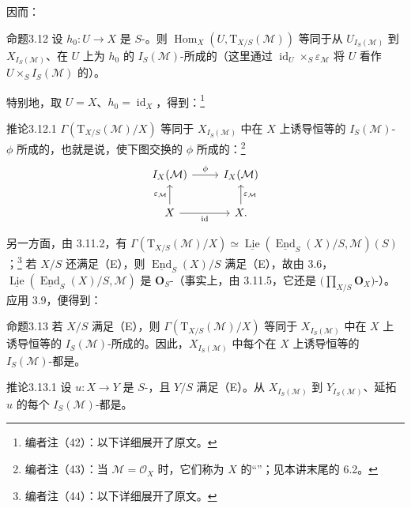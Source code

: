 因而：
\begin{SGAresult}{命题}{3.12}
设 $h_0:U\to X$ 是 $S$-。则 $\operatorname{Hom}_X(U,\mathrm T_{X/S}(\mathcal M))$ 等同于从 $U_{I_S(\mathcal M)}$ 到 $X_{I_S(\mathcal M)}$、在 $U$ 上为 $h_0$ 的 $I_S(\mathcal M)$-所成的（这里通过 $\operatorname{id}_U\times_S\varepsilon_{\mathcal M}$ 将 $U$ 看作 $U\times_S I_S(\mathcal M)$ 的）。
\end{SGAresult}
特别地，取 $U=X$、$h_0=\operatorname{id}_X$，得到：\footnote{编者注（42）：以下详细展开了原文。}
\begin{SGAresult}{推论}{3.12.1}
 $\Gamma(\mathrm T_{X/S}(\mathcal M)/X)$ 等同于 $X_{I_S(\mathcal M)}$ 中在 $X$ 上诱导恒等的 $I_S(\mathcal M)$- $\phi$ 所成的，也就是说，使下图交换的 $\phi$ 所成的：\footnote{编者注（43）：当 $\mathcal M=\mathcal O_X$ 时，它们称为 $X$ 的“”；见本讲末尾的 6.2。}
\[
\begin{tikzcd}
I_X(\mathcal M)\arrow[r,"\phi"]&I_X(\mathcal M)\\
X\arrow[u,"\varepsilon_{\mathcal M}"]\arrow[r,"\operatorname{id}"']&X\arrow[u,"\varepsilon_{\mathcal M}"'].
\end{tikzcd}
\]
\end{SGAresult}
另一方面，由 3.11.2，有 $\Gamma(\mathrm T_{X/S}(\mathcal M)/X)\simeq\underline{\operatorname{Lie}}(\underline{\operatorname{End}}_S(X)/S,\mathcal M)(S)$；\footnote{编者注（44）：以下详细展开了原文。} 若 $X/S$ 还满足（E），则 $\underline{\operatorname{End}}_S(X)/S$ 满足（E），故由 3.6，$\underline{\operatorname{Lie}}(\underline{\operatorname{End}}_S(X)/S,\mathcal M)$ 是 $\mathbf O_S$-（事实上，由 3.11.5，它还是 $\bigl(\prod_{X/S}\mathbf O_X\bigr)$-）。应用 3.9，便得到：
\begin{SGAresult}{命题}{3.13}
若 $X/S$ 满足（E），则 $\Gamma(\mathrm T_{X/S}(\mathcal M)/X)$ 等同于 $X_{I_S(\mathcal M)}$ 中在 $X$ 上诱导恒等的 $I_S(\mathcal M)$-所成的。因此，$X_{I_S(\mathcal M)}$ 中每个在 $X$ 上诱导恒等的 $I_S(\mathcal M)$-都是。
\end{SGAresult}
\begin{SGAresult}{推论}{3.13.1}
设 $u:X\to Y$ 是 $S$-，且 $Y/S$ 满足（E）。从 $X_{I_S(\mathcal M)}$ 到 $Y_{I_S(\mathcal M)}$、延拓 $u$ 的每个 $I_S(\mathcal M)$-都是。
\end{SGAresult}
